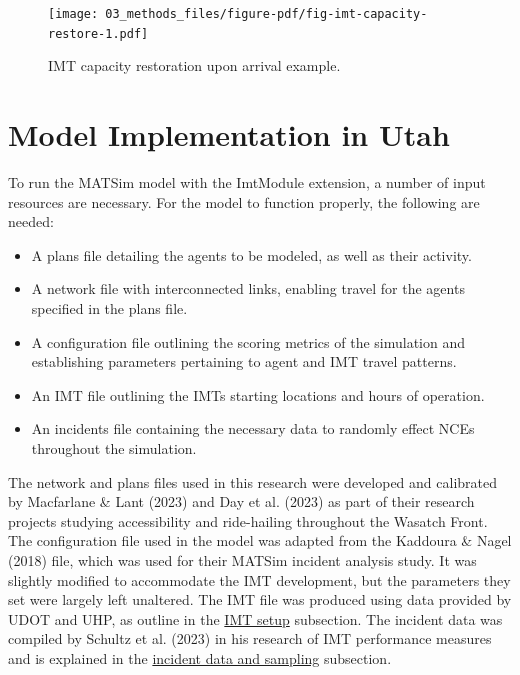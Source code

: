 \documentclass[fancy, oneside, mastersfancy, ms]{byuthesis}
\providecommand{\tightlist}{%
  \setlength{\itemsep}{0pt}\setlength{\parskip}{0pt}}\usepackage{longtable,booktabs,array}
\begin{document}
\begin{figure}

{\centering \texttt{[image: 03\_methods\_files/figure-pdf/fig-imt-capacity-restore-1.pdf]}

}

\caption{\label{fig-imt-capacity-restore}IMT capacity restoration upon
arrival example.}

\end{figure}

\hypertarget{sec-model_imp}{%
\section{Model Implementation in Utah}\label{sec-model_imp}}

To run the MATSim model with the ImtModule extension, a number of input
resources are necessary. For the model to function properly, the
following are needed:

\begin{itemize}
\tightlist
\item
  A plans file detailing the agents to be modeled, as well as their
  activity.
\item
  A network file with interconnected links, enabling travel for the
  agents specified in the plans file.
\item
  A configuration file outlining the scoring metrics of the simulation
  and establishing parameters pertaining to agent and IMT travel
  patterns.
\item
  An IMT file outlining the IMTs starting locations and hours of
  operation.
\item
  An incidents file containing the necessary data to randomly effect
  NCEs throughout the simulation.
\end{itemize}

The network and plans files used in this research were developed and
calibrated by Macfarlane \& Lant (2023) and Day et al. (2023) as part of
their research projects studying accessibility and ride-hailing
throughout the Wasatch Front. The configuration file used in the model
was adapted from the Kaddoura \& Nagel (2018) file, which was used for
their MATSim incident analysis study. It was slightly modified to
accommodate the IMT development, but the parameters they set were
largely left unaltered. The IMT file was produced using data provided by
UDOT and UHP, as outline in the \protect\hyperlink{sec-MATSim_mod}{IMT
setup} subsection. The incident data was compiled by Schultz et al.
(2023) in his research of IMT performance measures and is explained in
the \protect\hyperlink{sec-inc_data}{incident data and sampling}
subsection.
\end{document}
